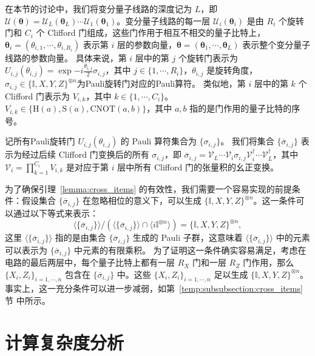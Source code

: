 在本节的讨论中，我们将变分量子线路的深度记为 $L$，即 $\mathcal{U}(\bm{\theta})=\mathcal{U}_L(\bm{\theta}_L)\cdots\mathcal{U}_1(\bm{\theta}_1)$。变分量子线路的每一层 $\mathcal{U}_i(\bm{\theta}_i)$ 是由 $R_i$ 个旋转门和 $C_i$ 个 Clifford 门组成，这些门作用于相互不相交的量子比特上，$\bm{\theta}_i=(\theta_{i,1},\cdots,\theta_{i,R_i})$ 表示第 $i$ 层的参数向量，$\bm{\theta}=(\bm{\theta}_1,\cdots,\bm{\theta}_L)$ 表示整个变分量子线路的参数向量。
具体来说，第 $i$ 层中的第 $j$ 个旋转门表示为 $U_{i, j}(\theta_{i,j})=\exp{-i \frac{\theta_{i,j}}{2} \sigma_{i,j}}$，其中 $j \in \{1, \cdots , R_i\}$，$\theta_{i,j}$ 是旋转角度，$\sigma_{i, j}\in \{\mathbb{I}, X,Y,Z\}^{\otimes n}$为Pauli旋转门对应的Pauli算符。
类似地，第 $i$ 层中的第 $k$ 个 Clifford 门表示为 $V_{i,k}$，其中 $k \in \{1, \cdots , C_i\}$。$V_{i,k}\in\{\mathrm{H}(a),\mathrm{S}(a),\mathrm{CNOT}(a,b)\}$，其中 $a,b $ 指的是门作用的量子比特的序号。

记所有Pauli旋转门 $U_{i,j}(\theta_{i,j})$ 的 Pauli 算符集合为 $\{\sigma_{i,j}\}$。
我们将集合 $\{\overline{\sigma}_{i,j}\}$ 表示为经过后续 Clifford 门变换后的所有 $\sigma_{i,j}$，即 $\overline{\sigma}_{i,j}= \mathcal{V}_{L} \cdots \mathcal{V}_{i} \sigma_{i,j} \mathcal{V}_{i}^\dagger \cdots \mathcal{V}_{L}^\dagger$，其中 $\mathcal{V}_{i} = \prod_{k=1}^{C_i} V_{i,k}$ 是对应于第 $i$ 层中所有 Clifford 门的张量积的幺正变换。

为了确保引理~\ref{lemma:cross_items} 的有效性，我们需要一个容易实现的前提条件：假设集合 $\{\overline{\sigma}_{i,j}\}$ 在忽略相位的意义下，可以生成 $\{\mathbb{I}, X, Y, Z\}^{\otimes n}$。这一条件可以通过以下等式来表示：
\begin{equation}\label{eq:generate}
  \langle \{\overline{\sigma}_{i,j}\}\rangle/\left(\langle \{\overline{\sigma}_{i,j}\}\rangle\cap\langle i\mathbb{I}^{\otimes n}\rangle\right)=\{\mathbb{I},X,Y,Z\}^{\otimes n},
\end{equation}
这里 $\langle \{\overline{\sigma}_{i,j}\} \rangle$ 指的是由集合 $\{\overline{\sigma}_{i,j}\}$ 生成的 Pauli 子群，这意味着 $\langle \{\overline{\sigma}_{i,j}\}\rangle$ 中的元素可以表示为 $\{\overline{\sigma}_{i,j}\}$ 中元素的有限乘积。
为了证明这一条件确实容易满足，考虑在电路的最后两层中，每个量子比特上都有一层 $R_X$ 门和一层 $R_Z$ 门作用，那么 $\{X_i, Z_i\}_{i=1,\cdots,n}$ 包含在 $\{\overline{\sigma}_{i,j}\}$ 中。这些 $\{ X_i,Z_i \}_{i=1,\cdots,n}$ 足以生成 $\{\mathbb{I},X,Y,Z\}^{\otimes n}$。事实上，这一充分条件可以进一步减弱，如第~\ref{temp:subsubsection:cross_items}节 中所示。


\section{计算复杂度分析}

